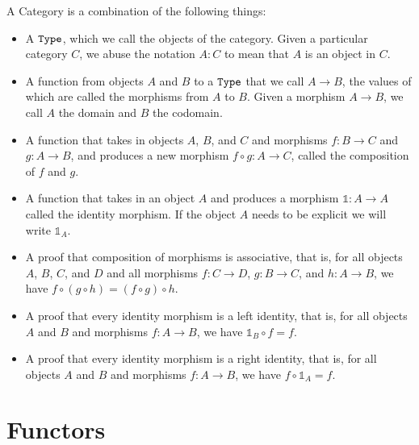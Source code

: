 \documentclass[../math.tex]{subfiles}
\begin{document}
\begin{definition}
    A Category is a combination of the following things:
    \begin{itemize}
        \item A $\Type$, which we call the objects of the category.  Given a
            particular category $C$, we abuse the notation $A : C$ to mean that
            $A$ is an object in $C$.
        \item A function from objects $A$ and $B$ to a $\Type$ that we call $A
            \to B$, the values of which are called the morphisms from $A$ to
            $B$.  Given a morphism $A \to B$, we call $A$ the domain and $B$ the
            codomain.
        \item A function that takes in objects $A$, $B$, and
            $C$ and morphisms $f : B \to C$ and $g : A \to B$, and produces a
            new morphism $f \circ g : A \to C$, called the composition of $f$
            and $g$.
        \item A function that takes in an object $A$ and produces a morphism
            $\mathds 1 : A \to A$ called the identity morphism.  If the object
            $A$ needs to be explicit we will write $\mathds 1_A$.
        \item A proof that composition of morphisms is associative, that is, for
            all objects $A$, $B$, $C$, and $D$ and all morphisms $f : C \to D$,
            $g : B \to C$, and $h : A \to B$, we have $f \circ (g \circ h) = (f
            \circ g) \circ h$.
        \item A proof that every identity morphism is a left identity, that is,
            for all objects $A$ and $B$ and morphisms $f : A \to B$, we have
            $\mathds 1_B \circ f = f$.
        \item A proof that every identity morphism is a right identity, that is,
            for all objects $A$ and $B$ and morphisms $f : A \to B$, we have
            $f \circ \mathds 1_A= f$.
    \end{itemize}
\end{definition}

\section{Functors}
\end{document}

